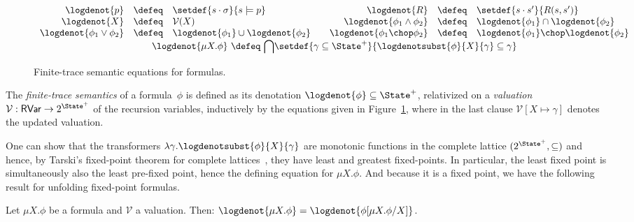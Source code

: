 \documentclass[a4paper,numberwithinsect]{lipics-v2021}
\newcommand{\bordertext}[1]{
\setlength{\fboxsep}{5pt}%
\setlength{\fboxrule}{0.5pt}%
\fbox{\parbox[c]{0.95\textwidth}{#1}}
}
\begin{document}
\begin{figure}%
  \centering
  $ \begin{array}{rcl@{\qquad}rcl}
   \logdenot{p}  & \defeq & 
      \setdef{s \cdot \sigma}{s \models p} &
   \logdenot{R}  & \defeq & 
      \setdef{s \cdot s'}{R (s, s')} \\
   \logdenot{X}  & \defeq & 
      \mathcal{V} (X) &
   \logdenot{\phi_1 \wedge \phi_2}  & \defeq & 
      \logdenot{\phi_1} \cap \logdenot{\phi_2} \\
   \logdenot{\phi_1 \vee \phi_2}  & \defeq & 
      \logdenot{\phi_1} \cup \logdenot{\phi_2} &
   \logdenot{\phi_1 \chop \phi_2}  & \defeq & 
      \logdenot{\phi_1} \chop \logdenot{\phi_2} \\
   \multicolumn{6}{c}{\logdenot{\mu X. \phi}  \ \defeq \ 
      {\displaystyle\bigcap} \setdef{\gamma \subseteq \State^+}
                     {\logdenotsubst{\phi}{X}{\gamma} \subseteq \gamma}}
   \end{array} $
\caption{Finite-trace semantic equations for formulas.}
\label{fig:logic-semantics}
\end{figure}

\begin{definition}
  \label{def:logic-semantics}
  The \emph{finite-trace semantics} of a formula~$\phi$ is defined as
  its denotation $\logdenot{\phi} \subseteq \State^+$, relativized on
  a \emph{valuation}
  $\mathcal{V} : \mathsf{RVar} \rightarrow 2^{\State^+}$ of the
  recursion variables, inductively by the equations given in
  Figure~\ref{fig:logic-semantics}, where in the last clause
  $\mathcal{V} [X \mapsto \gamma]$ denotes the updated valuation.
\end{definition}

One can show that the transformers
$\lambda \gamma.\logdenotsubst{\phi}{X}{\gamma}$ are monotonic
functions in the complete lattice $(2^{\State^+}, \subseteq)$ and
hence, by Tarski's fixed-point theorem for complete
lattices~\cite{tar-53}, they have least and greatest fixed-points.
%
In particular, the least fixed point is simultaneously also the least
pre-fixed point, hence the defining equation for $\mu X. \phi$.
%
And because it is a fixed point, we have the following result for
unfolding fixed-point formulas.

\begin{proposition}
  \label{prop:fixed-point-unfolding}
  Let $\mu X. \phi$ be a formula and $\mathcal{V}$ a valuation.  Then:
  $
  \logdenot{\mu X. \phi} = \logdenot{\phi [\mu X. \phi / X]}
  $.
\end{proposition}
\end{document}
